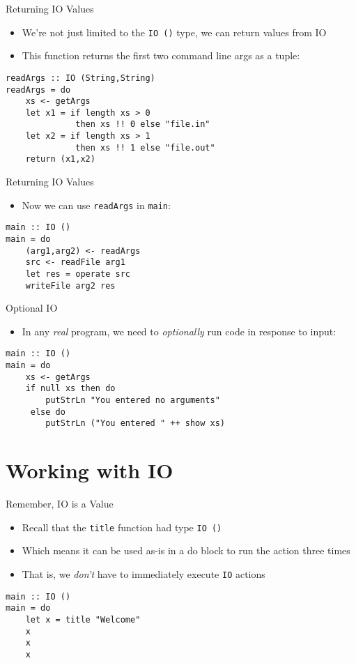 \documentclass{beamer}
\begin{document}
\begin{frame}[containsverbatim]{Returning IO Values}
\begin{itemize}
\item We're not just limited to the \lstinline{IO ()} type, we can return values from IO
\item This function returns the first two command line args as a tuple:
\end{itemize}
\begin{lstlisting}
readArgs :: IO (String,String)
readArgs = do
    xs <- getArgs
    let x1 = if length xs > 0
              then xs !! 0 else "file.in"
    let x2 = if length xs > 1
              then xs !! 1 else "file.out"
    return (x1,x2)
\end{lstlisting}
\end{frame}

\begin{frame}[containsverbatim]{Returning IO Values}
\begin{itemize}
\item Now we can use \lstinline{readArgs} in \lstinline{main}:
\end{itemize}
\begin{lstlisting}
main :: IO ()
main = do
    (arg1,arg2) <- readArgs
    src <- readFile arg1
    let res = operate src
    writeFile arg2 res
\end{lstlisting}
\end{frame}

\begin{frame}[containsverbatim]{Optional IO}
\begin{itemize}
\item In any \emph{real} program, we need to \emph{optionally} run code in response to input:
\end{itemize}
\begin{lstlisting}
main :: IO ()
main = do
    xs <- getArgs
    if null xs then do
        putStrLn "You entered no arguments"
     else do
        putStrLn ("You entered " ++ show xs)
\end{lstlisting}
\end{frame}


\section{Working with IO}

\begin{frame}[containsverbatim]{Remember, IO is a Value}
\begin{itemize}
\item Recall that the \lstinline{title} function had type \lstinline{IO ()}
\item Which means it can be used as-is in a do block to run the action three times
\item That is, we \emph{don't} have to immediately execute
\lstinline{IO} actions
\end{itemize}
\begin{lstlisting}
main :: IO ()
main = do
    let x = title "Welcome"
    x
    x
    x
\end{lstlisting}
\end{frame}
\end{document}
